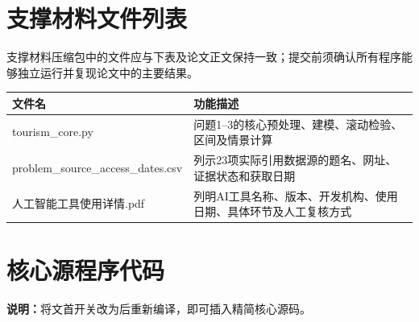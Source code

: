 \documentclass[withoutpreface,bwprint]{cumcmthesis}
\newif\iffinalsourcecode
\begin{document}
\clearpage
\begin{appendices}
	
	
	
	
\section{支撑材料文件列表}
支撑材料压缩包中的文件应与下表及论文正文保持一致；提交前须确认所有程序能够独立运行并复现论文中的主要结果。
\begin{table}[H]
\centering
\begin{tabularx}{\textwidth}{LL}
\toprule
文件名   & 功能描述 \\
\midrule
tourism\_core.py & 问题1--3的核心预处理、建模、滚动检验、区间及情景计算 \\
problem\_source\_access\_dates.csv & 列示23项实际引用数据源的题名、网址、证据状态和获取日期 \\
人工智能工具使用详情.pdf & 列明AI工具名称、版本、开发机构、使用日期、具体环节及人工复核方式 \\
\bottomrule
\end{tabularx}
\label{tab:文件列表}
\end{table}








\section{核心源程序代码}
\iffinalsourcecode
\lstset{
  basicstyle=\scriptsize\ttfamily,
  frame=single,
  numbers=left,
  numberstyle=\tiny,
  breaklines=true,
  columns=fullflexible,
  showstringspaces=false
}

\noindent 为控制篇幅，附录删去数据文件读写、来源整理、结果导出、图形绘制与边缘性实现，仅保留正文明确使用的对数线性补值、指数回归、扩展窗口检验、原尺度Ridge、固定设计残差自助法、情景恒等式及OAT敏感性分析。

\else
\begin{mdframed}
\textbf{说明：}将文首开关改为\texttt{\string\finalsourcecodetrue}后重新编译，即可插入精简核心源码。
\end{mdframed}
\fi

\end{appendices}
\end{document}
